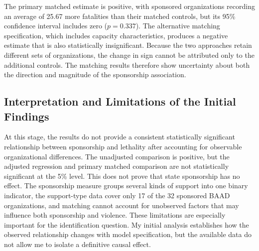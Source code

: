 \documentclass{article}
\begin{document}
The primary matched estimate is positive, with sponsored organizations recording an average of 25.67 more fatalities than their matched controls, but its 95\% confidence interval includes zero ($p=0.337$). The alternative matching specification, which includes capacity characteristics, produces a negative estimate that is also statistically insignificant. Because the two approaches retain different sets of organizations, the change in sign cannot be attributed only to the additional controls. The matching results therefore show uncertainty about both the direction and magnitude of the sponsorship association.

\subsection{Interpretation and Limitations of the Initial Findings}

At this stage, the results do not provide a consistent statistically significant relationship between sponsorship and lethality after accounting for observable organizational differences. The unadjusted comparison is positive, but the adjusted regression and primary matched comparison are not statistically significant at the 5\% level. This does not prove that state sponsorship has no effect. The sponsorship measure groups several kinds of support into one binary indicator, the support-type data cover only 17 of the 32 sponsored BAAD organizations, and matching cannot account for unobserved factors that may influence both sponsorship and violence. These limitations are especially important for the identification question. My initial analysis establishes how the observed relationship changes with model specification, but the available data do not allow me to isolate a definitive causal effect.
\end{document}
